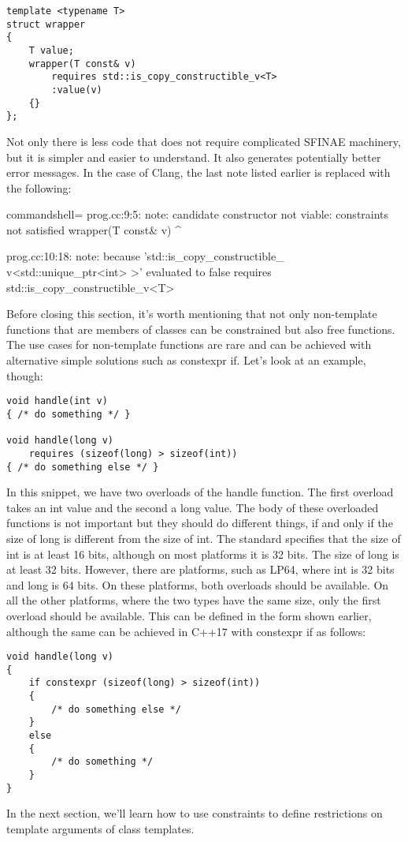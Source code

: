 \begin{lstlisting}[style=styleCXX]
template <typename T>
struct wrapper
{
	T value;
	wrapper(T const& v)
		requires std::is_copy_constructible_v<T>
		:value(v)
	{}
};
\end{lstlisting}

Not only there is less code that does not require complicated SFINAE machinery, but it is simpler and easier to understand. It also generates potentially better error messages. In the case of Clang, the last note listed earlier is replaced with the following:

\begin{tcblisting}{commandshell={}}
prog.cc:9:5: note: candidate constructor not viable:
constraints not satisfied
    wrapper(T const& v)
    ^

prog.cc:10:18: note: because 'std::is_copy_constructible_
v<std::unique_ptr<int> >' evaluated to false
        requires std::is_copy_constructible_v<T>
\end{tcblisting}

Before closing this section, it’s worth mentioning that not only non-template functions that are members of classes can be constrained but also free functions. The use cases for non-template functions are rare and can be achieved with alternative simple solutions such as constexpr if. Let’s look at an example, though:

\begin{lstlisting}[style=styleCXX]
void handle(int v)
{ /* do something */ }

void handle(long v)
	requires (sizeof(long) > sizeof(int))
{ /* do something else */ }
\end{lstlisting}

In this snippet, we have two overloads of the handle function. The first overload takes an int value and the second a long value. The body of these overloaded functions is not important but they should do different things, if and only if the size of long is different from the size of int. The standard specifies that the size of int is at least 16 bits, although on most platforms it is 32 bits. The size of long is at least 32 bits. However, there are platforms, such as LP64, where int is 32 bits and long is 64 bits. On these platforms, both overloads should be available. On all the other platforms, where the two types have the same size, only the first overload should be available. This can be defined in the form shown earlier, although the same can be achieved in C++17 with constexpr if as follows:

\begin{lstlisting}[style=styleCXX]
void handle(long v)
{
	if constexpr (sizeof(long) > sizeof(int))
	{
		/* do something else */
	}
	else
	{
		/* do something */
	}
}
\end{lstlisting}

In the next section, we’ll learn how to use constraints to define restrictions on template arguments of class templates.


